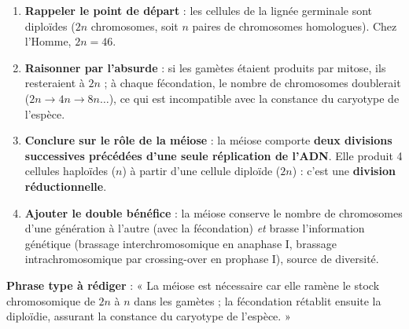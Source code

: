 \documentclass[11pt]{article}
\newcommand{\cle}[1]{{\popxbold\color{popdark}#1}}
\begin{document}
\begin{methode}
\begin{enumerate}
\item \textbf{Rappeler le point de départ} : les cellules de la lignée germinale sont \cle{diploïdes} ($2n$ chromosomes, soit $n$ paires de chromosomes homologues). Chez l'Homme, $2n = 46$.
\item \textbf{Raisonner par l'absurde} : si les gamètes étaient produits par mitose, ils resteraient à $2n$ ; à chaque fécondation, le nombre de chromosomes doublerait ($2n \rightarrow 4n \rightarrow 8n \ldots$), ce qui est incompatible avec la \cle{constance du caryotype} de l'espèce.
\item \textbf{Conclure sur le rôle de la méiose} : la méiose comporte \textbf{deux divisions successives précédées d'une seule réplication de l'ADN}. Elle produit 4 cellules \cle{haploïdes} ($n$) à partir d'une cellule diploïde ($2n$) : c'est une \textbf{division réductionnelle}.
\item \textbf{Ajouter le double bénéfice} : la méiose conserve le nombre de chromosomes d'une génération à l'autre (avec la fécondation) \emph{et} brasse l'information génétique (brassage interchromosomique en anaphase I, brassage intrachromosomique par crossing-over en prophase I), source de diversité.
\end{enumerate}
\textbf{Phrase type à rédiger} : « La méiose est nécessaire car elle ramène le stock chromosomique de $2n$ à $n$ dans les gamètes ; la fécondation rétablit ensuite la diploïdie, assurant la constance du caryotype de l'espèce. »
\end{methode}
\end{document}
